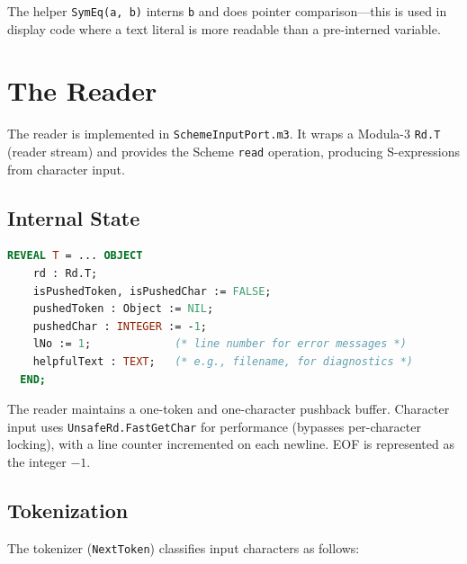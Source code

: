 \documentclass[12pt]{report}
\begin{document}
The helper \texttt{SymEq(a, b)} interns \texttt{b} and does pointer
comparison---this is used in display code where a text literal is more
readable than a pre-interned variable.

\chapter{The Reader}
\label{ch:reader}

The reader is implemented in \texttt{SchemeInputPort.m3}.  It wraps a
Modula-3 \texttt{Rd.T} (reader stream) and provides the Scheme
\texttt{read} operation, producing S-expressions from character input.

\section{Internal State}

\begin{lstlisting}[language=Modula3]
REVEAL T = ... OBJECT
    rd : Rd.T;
    isPushedToken, isPushedChar := FALSE;
    pushedToken : Object := NIL;
    pushedChar : INTEGER := -1;
    lNo := 1;             (* line number for error messages *)
    helpfulText : TEXT;   (* e.g., filename, for diagnostics *)
  END;
\end{lstlisting}

The reader maintains a one-token and one-character pushback buffer.
Character input uses \texttt{UnsafeRd.FastGetChar} for performance
(bypasses per-character locking), with a line counter incremented on
each newline.  EOF is represented as the integer $-1$.

\section{Tokenization}

The tokenizer (\texttt{NextToken}) classifies input characters as follows:
\end{document}
